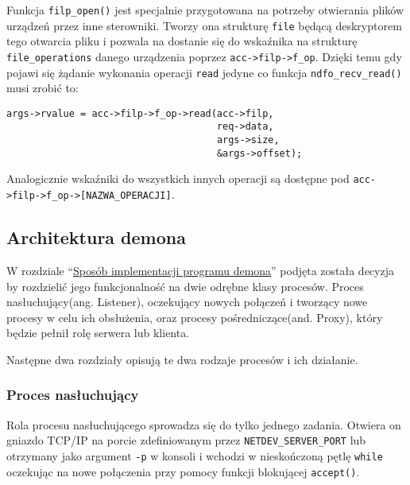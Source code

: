 Funkcja \texttt{filp\_open()} jest specjalnie przygotowana na potrzeby
otwierania plików urządzeń przez inne sterowniki. Tworzy ona strukturę
\texttt{file} będącą deskryptorem tego otwarcia pliku i pozwala na
dostanie się do wskaźnika na strukturę \texttt{file\_operations} danego
urządzenia poprzez \texttt{acc-\textgreater{}filp-\textgreater{}f\_op}.
Dzięki temu gdy pojawi się żądanie wykonania operacji \texttt{read}
jedyne co funkcja \texttt{ndfo\_recv\_read()} musi zrobić to:

\begin{verbatim}
args->rvalue = acc->filp->f_op->read(acc->filp,
                                     req->data,
                                     args->size,
                                     &args->offset);
\end{verbatim}

Analogicznie wskaźniki do wszystkich innych operacji są dostępne pod
\texttt{acc-\textgreater{}filp-\textgreater{}f\_op-\textgreater{}{[}NAZWA\_OPERACJI{]}}.

\subsection{Architektura demona}

W rozdziale ``\hyperref[sposób-implementacji-programu-demona]{Sposób
implementacji programu demona}'' podjęta została decyzja by rozdzielić
jego funkcjonalność na dwie odrębne klasy procesów. Proces
nasłuchujący(ang. Listener), oczekujący nowych połączeń i tworzący nowe
procesy w celu ich obsłużenia, oraz procesy pośredniczące(and. Proxy),
który będzie pełnił rolę serwera lub klienta.

Następne dwa rozdziały opisują te dwa rodzaje procesów i ich działanie.

\subsubsection{Proces nasłuchujący}

Rola procesu nasłuchującego sprowadza się do tylko jednego zadania.
Otwiera on gniazdo TCP/IP na porcie zdefiniowanym przez
\texttt{NETDEV\_SERVER\_PORT} lub otrzymany jako argument \texttt{-p} w
konsoli i wchodzi w nieskończoną pętlę \texttt{while} oczekując na nowe
połączenia przy pomocy funkcji blokującej \texttt{accept()}.

